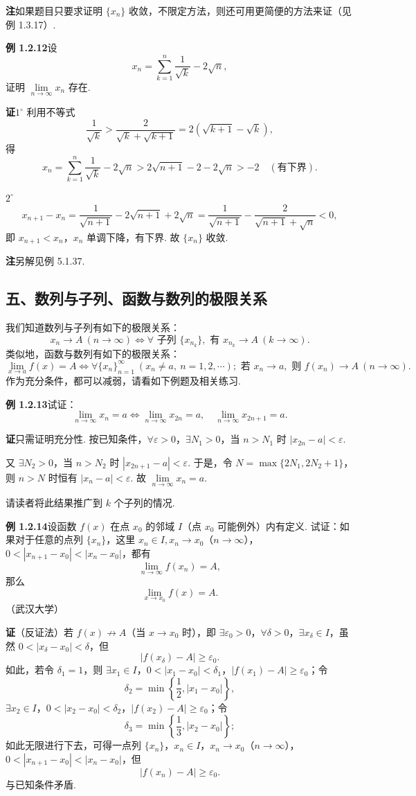 \documentclass[UTF8, 12pt, fontset=fandol, oneside]{ctexart}
\begin{document}
\noindent\textbf{注}\quad 如果题目只要求证明 $\{x_n\}$ 收敛，不限定方法，则还可用更简便的方法来证（见例 1.3.17）.

\noindent\textbf{例 1.2.12}\quad 设
\[
  x_n=\sum_{k=1}^n\frac1{\sqrt k}-2\sqrt n,
\]
证明 $\lim\limits_{n\to\infty}x_n$ 存在.

\noindent\textbf{证}\quad $1^\circ$ 利用不等式
\[
  \frac1{\sqrt k}>\frac2{\sqrt k+\sqrt{k+1}}=2(\sqrt{k+1}-\sqrt k),
\]
得
\[
  x_n=\sum_{k=1}^n\frac1{\sqrt k}-2\sqrt n
  >2\sqrt{n+1}-2-2\sqrt n>-2\quad(\text{有下界}).
\]

$2^\circ$
\[
  x_{n+1}-x_n=\frac1{\sqrt{n+1}}-2\sqrt{n+1}+2\sqrt n
  =\frac1{\sqrt{n+1}}-\frac2{\sqrt{n+1}+\sqrt n}<0,
\]
即 $x_{n+1}<x_n$，$x_n$ 单调下降，有下界. 故 $\{x_n\}$ 收敛.

\noindent\textbf{注}\quad 另解见例 5.1.37.

\subsection*{五、数列与子列、函数与数列的极限关系}

我们知道数列与子列有如下的极限关系：
\[
  x_n\to A\ (n\to\infty)\Leftrightarrow \forall\text{ 子列 }\{x_{n_k}\},\text{ 有 }x_{n_k}\to A\ (k\to\infty).
\]
类似地，函数与数列有如下的极限关系：
\[
  \lim_{x\to a}f(x)=A\Leftrightarrow
  \forall \{x_n\}_{n=1}^{\infty}\ (x_n\ne a,\ n=1,2,\cdots);\text{ 若 }x_n\to a,\text{ 则 }f(x_n)\to A\ (n\to\infty).
\]
作为充分条件，都可以减弱，请看如下例题及相关练习.

\noindent\textbf{例 1.2.13}\quad 试证：
\[
  \lim_{n\to\infty}x_n=a\Leftrightarrow
  \lim_{n\to\infty}x_{2n}=a,\quad
  \lim_{n\to\infty}x_{2n+1}=a.
\]

\noindent\textbf{证}\quad 只需证明充分性. 按已知条件，$\forall\varepsilon>0$，$\exists N_1>0$，当 $n>N_1$ 时 $|x_{2n}-a|<\varepsilon$.

又 $\exists N_2>0$，当 $n>N_2$ 时 $|x_{2n+1}-a|<\varepsilon$. 于是，令 $N=\max\{2N_1,2N_2+1\}$，则 $n>N$ 时恒有 $|x_n-a|<\varepsilon$. 故 $\lim\limits_{n\to\infty}x_n=a$.

请读者将此结果推广到 $k$ 个子列的情况.

\noindent\textbf{例 1.2.14}\quad 设函数 $f(x)$ 在点 $x_0$ 的邻域 $I$（点 $x_0$ 可能例外）内有定义. 试证：如果对于任意的点列 $\{x_n\}$，这里 $x_n\in I,x_n\to x_0$（$n\to\infty$），$0<|x_{n+1}-x_0|<|x_n-x_0|$，都有
\[
  \lim_{n\to\infty}f(x_n)=A,
\]
那么
\[
  \lim_{x\to x_0}f(x)=A.
\]
（武汉大学）

\noindent\textbf{证}\quad （反证法）若 $f(x)\not\to A$（当 $x\to x_0$ 时），即 $\exists\varepsilon_0>0$，$\forall\delta>0$，$\exists x_\delta\in I$，虽然 $0<|x_\delta-x_0|<\delta$，但
\[
  |f(x_\delta)-A|\ge\varepsilon_0.
\]
如此，若令 $\delta_1=1$，则 $\exists x_1\in I$，$0<|x_1-x_0|<\delta_1$，$|f(x_1)-A|\ge\varepsilon_0$；令
\[
  \delta_2=\min\left\{\frac12,|x_1-x_0|\right\},
\]
$\exists x_2\in I$，$0<|x_2-x_0|<\delta_2$，$|f(x_2)-A|\ge\varepsilon_0$；令
\[
  \delta_3=\min\left\{\frac13,|x_2-x_0|\right\};
\]
如此无限进行下去，可得一点列 $\{x_n\}$，$x_n\in I$，$x_n\to x_0$（$n\to\infty$），$0<|x_{n+1}-x_0|<|x_n-x_0|$，但
\[
  |f(x_n)-A|\ge\varepsilon_0.
\]
与已知条件矛盾.
\end{document}
